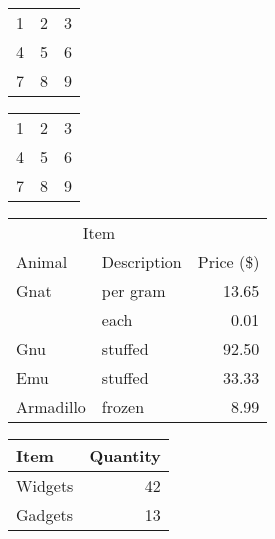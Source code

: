 \documentclass[10pt]{article}
\begin{document}
\vspace{5mm}
\begin{center}
\begin{tabular}{ l c r }
  1 & 2 & 3 \\
  4 & 5 & 6 \\
  7 & 8 & 9 \\
\end{tabular}
\end{center}

\vspace{5mm}
\vspace{5mm}

\begin{center}
\begin{tabular}{ l | c | r }
  1 & 2 & 3 \\
  4 & 5 & 6 \\
  7 & 8 & 9 \\
\end{tabular}
\vspace{5mm}
\end{center}



\begin{center}
\begin{tabular}{llr}
\hline
\multicolumn{2}{c}{Item} \\
\cline{1-2}
Animal    & Description & Price (\$) \\
\hline
Gnat      & per gram    & 13.65      \\
          & each        & 0.01       \\
Gnu       & stuffed     & 92.50      \\
Emu       & stuffed     & 33.33      \\
Armadillo & frozen      & 8.99       \\
\hline
\end{tabular}
\end{center}
\vspace{5mm}

\begin{center}
\begin{tabular}{lr}
\toprule %
Item & Quantity \\
\midrule %
Widgets & 42 \\
Gadgets & 13 \\
\bottomrule %
\end{tabular} 
\end{center}
\vspace{5mm}
\end{document}
